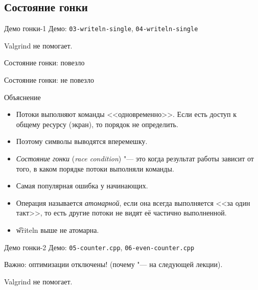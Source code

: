 \subsection{Состояние гонки}

\begin{frame}
\end{frame}

\begin{frame}{Демо гонки-1}
	Демо: \texttt{03-writeln-single}, \texttt{04-writeln-single}

	Valgrind не помогает.
\end{frame}

\begin{frame}{Состояние гонки: повезло}
\end{frame}

\begin{frame}{Состояние гонки: не повезло}
\end{frame}

\begin{frame}{Объяснение}
	\begin{itemize}
		\item
			Потоки выполняют команды <<одновременно>>.
			Если есть доступ к общему ресурсу (экран), то порядок не определить.
		\item
			Поэтому символы выводятся вперемешку.
		\item
			\textit{Состояние гонки} (\textit{race condition}) "--- это когда результат работы зависит от того, в каком порядке потоки выполняли команды.
		\item
			Самая популярная ошибка у начинающих.
		\item
			Операция называется \textit{атомарной}, если она всегда выполняется <<за один такт>>,
			то есть другие потоки не видят её частично выполненной.
		\item
			\t{writeln} выше не атомарна.
	\end{itemize}
\end{frame}

\begin{frame}{Демо гонки-2}
	Демо: \texttt{05-counter.cpp}, \texttt{06-even-counter.cpp}

	Важно: оптимизации отключены! (почему "--- на следующей лекции).

	Valgrind не помогает.
\end{frame}

